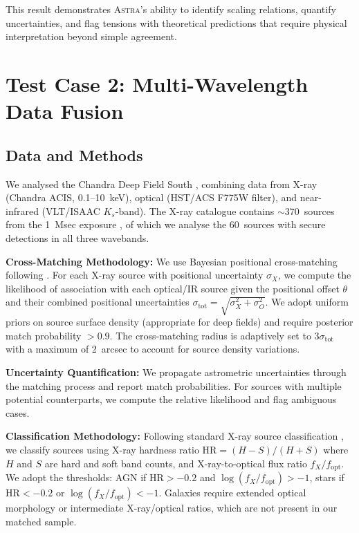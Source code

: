 \documentclass[fleqn,usenatbib]{mnras}
\newcommand{\astra}{\textsc{Astra}\xspace}
\begin{document}
This result demonstrates \astra's ability to identify scaling relations, quantify uncertainties, and flag tensions with theoretical predictions that require physical interpretation beyond simple agreement.

\section{Test Case 2: Multi-Wavelength Data Fusion}
\label{sec:tc2}

\subsection{Data and Methods}
\label{sec:tc2:data}

We analysed the Chandra Deep Field South \citep[CDFS;][]{Giacconi2001}, combining data from X-ray (Chandra ACIS, 0.1--10~keV), optical (HST/ACS F775W filter), and near-infrared (VLT/ISAAC $K_s$-band).
The X-ray catalogue contains $\sim\!370$~sources from the 1~Msec exposure \citep{Alexander2003}, of which we analyse the 60~sources with secure detections in all three wavebands.

\textbf{Cross-Matching Methodology:}
We use Bayesian positional cross-matching following \citet{SutherlandSaunders1992}.
For each X-ray source with positional uncertainty $\sigma_X$, we compute the likelihood of association with each optical/IR source given the positional offset $\theta$ and their combined positional uncertainties $\sigma_{\mathrm{tot}} = \sqrt{\sigma_X^2 + \sigma_O^2}$.
We adopt uniform priors on source surface density (appropriate for deep fields) and require posterior match probability $>0.9$.
The cross-matching radius is adaptively set to $3\sigma_{\mathrm{tot}}$ with a maximum of 2~arcsec to account for source density variations.

\textbf{Uncertainty Quantification:}
We propagate astrometric uncertainties through the matching process and report match probabilities.
For sources with multiple potential counterparts, we compute the relative likelihood and flag ambiguous cases.

\textbf{Classification Methodology:}
Following standard X-ray source classification \citep{Hornschemeier2001,Bauer2004}, we classify sources using X-ray hardness ratio $\mathrm{HR} = (H - S)/(H + S)$ where $H$ and $S$ are hard and soft band counts, and X-ray-to-optical flux ratio $f_X/f_{\mathrm{opt}}$.
We adopt the thresholds: AGN if $\mathrm{HR} > -0.2$ and $\log(f_X/f_{\mathrm{opt}}) > -1$, stars if $\mathrm{HR} < -0.2$ or $\log(f_X/f_{\mathrm{opt}}) < -1$.
Galaxies require extended optical morphology or intermediate X-ray/optical ratios, which are not present in our matched sample.
\end{document}
